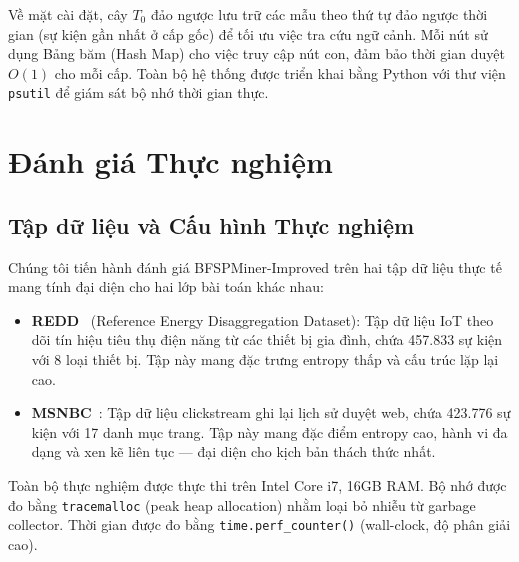 \documentclass[conference]{IEEEtran}
\begin{document}
Về mặt cài đặt, cây $T_0$ đảo ngược lưu trữ các mẫu theo thứ tự đảo ngược thời gian (sự kiện gần nhất ở cấp gốc) để tối ưu việc tra cứu ngữ cảnh. Mỗi nút sử dụng Bảng băm (Hash Map) cho việc truy cập nút con, đảm bảo thời gian duyệt $O(1)$ cho mỗi cấp. Toàn bộ hệ thống được triển khai bằng Python với thư viện \texttt{psutil} để giám sát bộ nhớ thời gian thực.

\section{Đánh giá Thực nghiệm}
\label{sec:experiments}

\subsection{Tập dữ liệu và Cấu hình Thực nghiệm}
Chúng tôi tiến hành đánh giá BFSPMiner-Improved trên hai tập dữ liệu thực tế mang tính đại diện cho hai lớp bài toán khác nhau:
\begin{itemize}
    \item \textbf{REDD}~\cite{kolter2011} (Reference Energy Disaggregation Dataset): Tập dữ liệu IoT theo dõi tín hiệu tiêu thụ điện năng từ các thiết bị gia đình, chứa 457.833 sự kiện với 8 loại thiết bị. Tập này mang đặc trưng entropy thấp và cấu trúc lặp lại cao.
    \item \textbf{MSNBC}~\cite{msnbc2000}: Tập dữ liệu clickstream ghi lại lịch sử duyệt web, chứa 423.776 sự kiện với 17 danh mục trang. Tập này mang đặc điểm entropy cao, hành vi đa dạng và xen kẽ liên tục --- đại diện cho kịch bản thách thức nhất.
\end{itemize}
Toàn bộ thực nghiệm được thực thi trên Intel Core i7, 16GB RAM. Bộ nhớ được đo bằng \texttt{tracemalloc} (peak heap allocation) nhằm loại bỏ nhiễu từ garbage collector. Thời gian được đo bằng \texttt{time.perf\_counter()} (wall-clock, độ phân giải cao).
\end{document}
